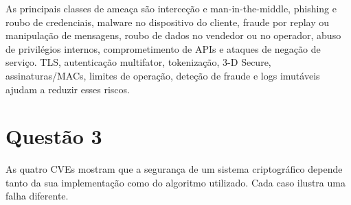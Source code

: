 \documentclass[11pt,a4paper]{article}
\begin{document}
As principais classes de ameaça são interceção e man-in-the-middle, phishing e roubo de credenciais, malware no dispositivo do cliente, fraude por replay ou manipulação de mensagens, roubo de dados no vendedor ou no operador, abuso de privilégios internos, comprometimento de APIs e ataques de negação de serviço. TLS, autenticação multifator, tokenização, 3-D Secure, assinaturas/MACs, limites de operação, deteção de fraude e logs imutáveis ajudam a reduzir esses riscos.

\section*{Questão 3}

As quatro CVEs mostram que a segurança de um sistema criptográfico depende tanto da sua implementação como do algoritmo utilizado. Cada caso ilustra uma falha diferente.
\end{document}
